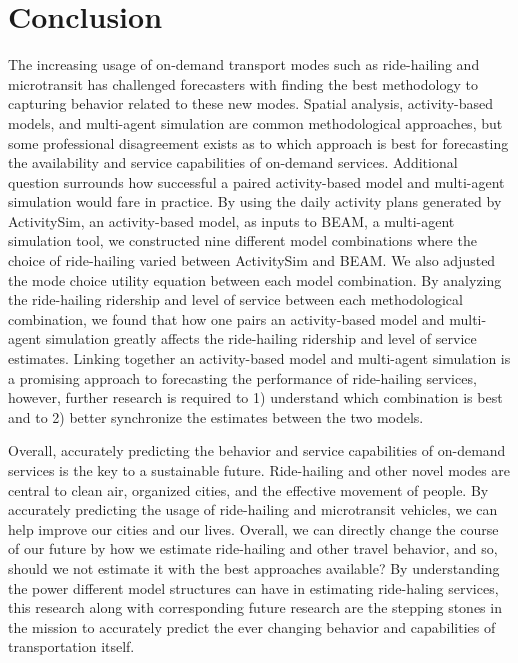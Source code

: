 \documentclass[simple, masters, twoside]{byuthesis}
\begin{document}
\hypertarget{conclusion}{%
\section{Conclusion}\label{conclusion}}

The increasing usage of on-demand transport modes such as ride-hailing and microtransit has challenged forecasters with finding the best methodology to capturing behavior related to these new modes. Spatial analysis, activity-based models, and multi-agent simulation are common methodological approaches, but some professional disagreement exists as to which approach is best for forecasting the availability and service capabilities of on-demand services. Additional question surrounds how successful a paired activity-based model and multi-agent simulation would fare in practice. By using the daily activity plans generated by ActivitySim, an activity-based model, as inputs to BEAM, a multi-agent simulation tool, we constructed nine different model combinations where the choice of ride-hailing varied between ActivitySim and BEAM. We also adjusted the mode choice utility equation between each model combination. By analyzing the ride-hailing ridership and level of service between each methodological combination, we found that how one pairs an activity-based model and multi-agent simulation greatly affects the ride-hailing ridership and level of service estimates. Linking together an activity-based model and multi-agent simulation is a promising approach to forecasting the performance of ride-hailing services, however, further research is required to 1) understand which combination is best and to 2) better synchronize the estimates between the two models.

Overall, accurately predicting the behavior and service capabilities of on-demand services is the key to a sustainable future. Ride-hailing and other novel modes are central to clean air, organized cities, and the effective movement of people. By accurately predicting the usage of ride-hailing and microtransit vehicles, we can help improve our cities and our lives. Overall, we can directly change the course of our future by how we estimate ride-hailing and other travel behavior, and so, should we not estimate it with the best approaches available? By understanding the power different model structures can have in estimating ride-haling services, this research along with corresponding future research are the stepping stones in the mission to accurately predict the ever changing behavior and capabilities of transportation itself.
\end{document}
